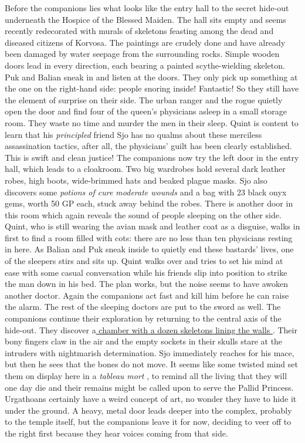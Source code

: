 Before the companions lies what looks like the entry hall to the secret hide-out underneath the Hospice of the Blessed Maiden. The hall sits empty and seems recently redecorated with murals of skeletons feasting among the dead and diseased citizens of Korvosa. The paintings are crudely done and have already been damaged by water seepage from the surrounding rocks. Simple wooden doors lead in every direction, each bearing a painted scythe-wielding skeleton.\\

Puk and Balian sneak in and listen at the doors. They only pick up something at the one on the right-hand side: people snoring inside! Fantastic! So they still have the element of surprise on their side. The urban ranger and the rogue quietly open the door and find four of the queen's physicians asleep in a small storage room. They waste no time and murder the men in their sleep. Quint is content to learn that his {\itshape principled} friend Sjo has no qualms about these merciless assassination tactics, after all, the physicians' guilt has been clearly established. This is swift and clean justice! The companions now try the left door in the entry hall, which leads to a cloakroom. Two big wardrobes hold several dark leather robes, high boots, wide-brimmed hats and beaked plague masks. Sjo also discovers some {\itshape potions of cure moderate wounds} and a bag with 23 black onyx gems, worth 50 GP each, stuck away behind the robes. There is another door in this room which again reveals the sound of people sleeping on the other side. Quint, who is still wearing the avian mask and leather coat as a disguise, walks in first to find a room filled with cots: there are no less than ten physicians resting in here. As Balian and Puk sneak inside to quietly end these bastards' lives, one of the sleepers stirs and sits up. Quint walks over and tries to set his mind at ease with some casual conversation while his friends slip into position to strike the man down in his bed. The plan works, but the noise seems to have awoken another doctor. Again the companions act fast and kill him before he can raise the alarm. The rest of the sleeping doctors are put to the sword as well. The companions continue their exploration by returning to the central axis of the hide-out. They discover a\hyperref[fig:Bacchanal-of-Urgathoa-beneath-the-Hospice-520054146 ]{ chamber with a dozen skeletons lining the walls } . Their bony fingers claw in the air and the empty sockets in their skulls stare at the intruders with nightmarish determination. Sjo immediately reaches for his mace, but then he sees that the bones do not move. It seems like some twisted mind set them on display here in a  {\itshape tableau mort} , to remind all the living that they will one day die and their remains might be called upon to serve the Pallid Princess. Urgathoans certainly have a weird concept of art, no wonder they have to hide it under the ground. A heavy, metal door leads deeper into the complex, probably to the temple itself, but the companions leave it for now, deciding to veer off to the right first because they hear voices coming from that side. \\

